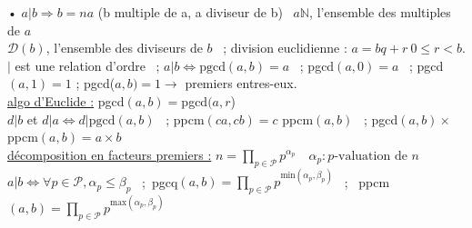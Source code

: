 \documentclass[12 pt]{exampleclass}
\begin{document}
\begin{flushleft}
\begin{doublespace}

	• $a|b \Rightarrow b=na$ (b multiple de a, a diviseur de b) \ $a\mathbb{N}$, l'ensemble des multiples de $a$\\
	$\mathcal{D}(b)$, l'ensemble des diviseurs de $b$ \ ;  division euclidienne : $a=bq+r \ 0\leq r<b$.\\
	$|$ est une relation d'ordre \ ; $a|b \Leftrightarrow \text{pgcd}(a,b)=a$ \ ; pgcd$(a,0)=a$ \ ; pgcd$(a,1)=1$ ; pgcd($a,b)=1 \rightarrow$ premiers entres-eux.\\
	\underline{algo d'Euclide :} pgcd$(a,b)=$pgcd$(a,r$)\\
	$d|b$ et $d|a \Leftrightarrow d|\text{pgcd}(a,b)$ \ ; ppcm$(ca,cb)=c$ ppcm$(a,b)$ \ ; pgcd$(a,b) \times$ppcm$(a,b)=a\times b $\\
	\underline{décomposition en facteurs premiers :} $n=\prod\limits_{p\in \mathcal{P}} p^{\alpha_p} \quad \alpha_p:p\text{-valuation de } n$\\
	$a|b \Leftrightarrow \forall p\in \mathcal{P}, \alpha_p \leq \beta_p$ \ ;\ pgcq$(a,b)=\prod\limits_{p\in \mathcal{P}} p^{\text{min}(\alpha_p ,\beta_p)}$ \ ; \ ppcm$(a,b)=\prod\limits_{p\in \mathcal{P}} p^{\text{max}(\alpha_p ,\beta_p)}$\\
	

\end{doublespace}
\end{flushleft}
\end{document}
